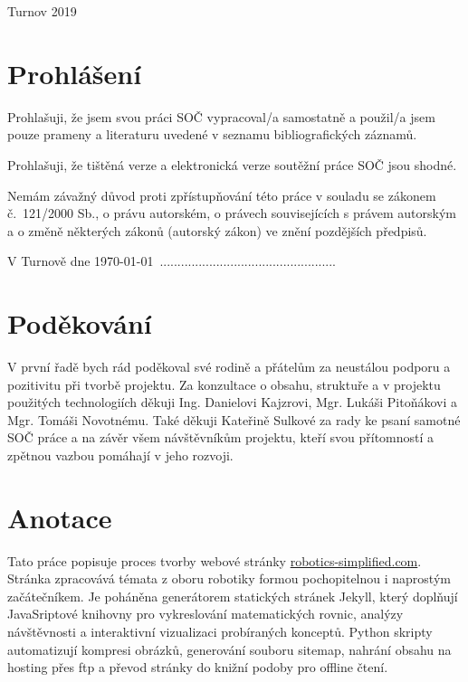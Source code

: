 \documentclass[a4paper, 12pt]{article}
\begin{document}
  \fontsize{12}{14.4} \selectfont
  Turnov 2019

  \vspace{4em}

  \newpage

  \section*{\normalfont\textbf{Prohlášení}}
  Prohlašuji, že jsem svou práci SOČ vypracoval/a samostatně a použil/a jsem pouze prameny a literaturu uvedené v seznamu bibliografických záznamů.

  Prohlašuji, že tištěná verze a elektronická verze soutěžní práce SOČ jsou shodné.

  Nemám závažný důvod proti zpřístupňování této práce v souladu se zákonem č.~121/2000 Sb., o právu autorském, o právech souvisejících s právem autorským a o změně některých zákonů (autorský zákon) ve znění pozdějších předpisů.

  \qquad

  V Turnově dne \today \, ..................................................\\%

  \newpage

  \section*{\normalfont\textbf{Poděkování}}
  V první řadě bych rád poděkoval své rodině a přátelům za neustálou podporu a pozitivitu při tvorbě projektu. Za konzultace o obsahu, struktuře a v projektu použitých technologiích děkuji Ing. Danielovi Kajzrovi, Mgr. Lukáši Pitoňákovi a Mgr. Tomáši Novotnému. Také děkuji Kateřině Sulkové za rady ke psaní samotné SOČ práce a na závěr všem návštěvníkům projektu, kteří svou přítomností a zpětnou vazbou pomáhají v jeho rozvoji.

  \newpage

  \section*{\normalfont\textbf{Anotace}}
  Tato práce popisuje proces tvorby webové stránky \url{robotics-simplified.com}. Stránka zpracovává témata z oboru robotiky formou pochopitelnou i naprostým začátečníkem. Je poháněna generátorem statických stránek Jekyll, který doplňují JavaSriptové knihovny pro vykreslování matematických rovnic, analýzy návštěvnosti a interaktivní vizualizaci probíraných konceptů. Python skripty automatizují kompresi obrázků, generování souboru sitemap, nahrání obsahu na hosting přes \acrshort{ftp} a převod stránky do knižní podoby pro offline čtení.
\end{document}
